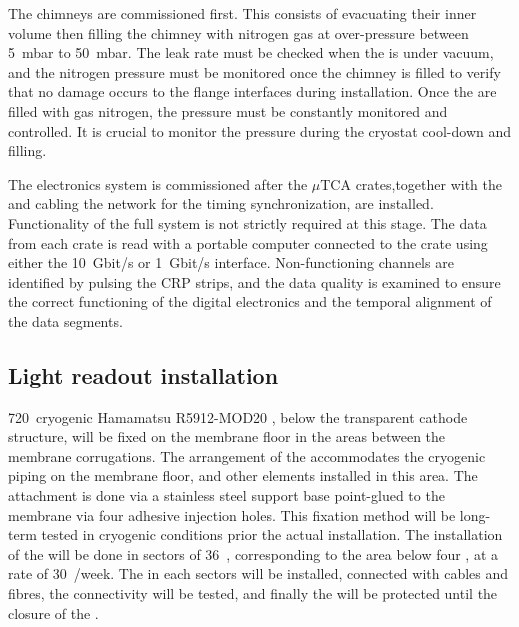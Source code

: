 The  chimneys are commissioned first. This consists of evacuating their inner volume then filling the chimney with nitrogen gas at over-pressure between 5~mbar to 50~mbar.
The leak rate must be checked when the  is under vacuum, and the nitrogen pressure must be monitored once the chimney is filled to verify that no damage occurs to the flange interfaces during installation.
Once the  are filled with gas nitrogen, the pressure must be constantly monitored and controlled.
It is crucial to monitor the  pressure during the cryostat cool-down and filling.

The electronics system is commissioned after the $\mu$TCA crates,together with the  and cabling the  network for the timing synchronization, are installed.
Functionality of the full  system is not strictly required at this stage.
The data from each crate is read with a portable computer connected to the crate using either the  10~Gbit/s or 1~Gbit/s interface.
Non-functioning channels are identified by pulsing the CRP strips, and the data quality is examined to ensure the correct functioning of the digital electronics and the temporal alignment of the data segments.

\subsection{Light readout installation}

720~cryogenic Hamamatsu R5912-MOD20 , below the transparent cathode structure, will be fixed on the membrane floor in the areas between the membrane corrugations.
The arrangement of the  accommodates the cryogenic piping on the membrane floor, and other elements installed in this area.
The attachment is done via a stainless steel support base point-glued to the membrane via four adhesive injection holes.
This fixation method will be long-term tested in cryogenic conditions prior the actual installation.
The installation of the  will be done in sectors of 36~, corresponding to the area below four , at a rate of 30~/week.
The  in each sectors will be installed, connected with cables and fibres, the connectivity will be tested, and finally the  will be protected until the closure of the . 

